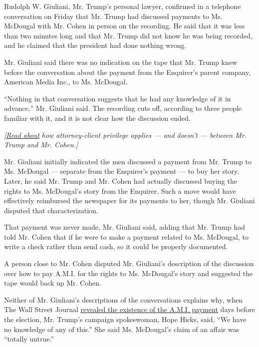 Rudolph W. Giuliani, Mr. Trump's personal lawyer, confirmed in a
telephone conversation on Friday that Mr. Trump had discussed payments
to Ms. McDougal with Mr. Cohen in person on the recording. He said that
it was less than two minutes long and that Mr. Trump did not know he was
being recorded, and he claimed that the president had done nothing
wrong.

Mr. Giuliani said there was no indication on the tape that Mr. Trump
knew before the conversation about the payment from the Enquirer's
parent company, American Media Inc., to Ms. McDougal.

``Nothing in that conversation suggests that he had any knowledge of it
in advance,'' Mr. Giuliani said. The recording cuts off, according to
three people familiar with it, and it is not clear how the discussion
ended.

\emph{{[}}\href{https://www.nytimes3xbfgragh.onion/2018/04/10/us/politics/trump-cohen-raids-legal-issues.html}{\emph{Read
about}} \emph{how attorney-client privilege applies --- and doesn't ---
between Mr. Trump and Mr. Cohen.{]}}

Mr. Giuliani initially indicated the men discussed a payment from Mr.
Trump to Ms. McDougal --- separate from the Enquirer's payment --- to
buy her story. Later, he said Mr. Trump and Mr. Cohen had actually
discussed buying the rights to Ms. McDougal's story from the Enquirer.
Such a move would have effectively reimbursed the newspaper for its
payments to her, though Mr. Giuliani disputed that characterization.

That payment was never made, Mr. Giuliani said, adding that Mr. Trump
had told Mr. Cohen that if he were to make a payment related to Ms.
McDougal, to write a check rather than send cash, so it could be
properly documented.

A person close to Mr. Cohen disputed Mr. Giuliani's description of the
discussion over how to pay A.M.I. for the rights to Ms. McDougal's story
and suggested the tape would back up Mr. Cohen.

Neither of Mr. Giuliani's descriptions of the conversations explains
why, when The Wall Street Journal
\href{https://www.wsj.com/articles/national-enquirer-shielded-donald-trump-from-playboy-models-affair-allegation-1478309380?mod=e2twp}{revealed
the existence of the A.M.I. payment} days before the election, Mr.
Trump's campaign spokeswoman, Hope Hicks, said, ``We have no knowledge
of any of this.'' She said Ms. McDougal's claim of an affair was
``totally untrue.''

